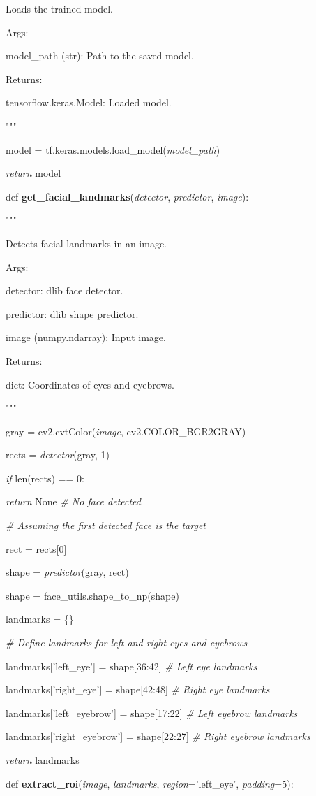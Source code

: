 \documentclass[
]{article}
\begin{document}
Loads the trained model.

Args:

model\_path (str): Path to the saved model.

Returns:

tensorflow.keras.Model: Loaded model.

"""

model = tf.keras.models.load\_model(\emph{model\_path})

\emph{return} model

def \textbf{get\_facial\_landmarks}(\emph{detector}, \emph{predictor}, \emph{image}):

"""

Detects facial landmarks in an image.

Args:

detector: dlib face detector.

predictor: dlib shape predictor.

image (numpy.ndarray): Input image.

Returns:

dict: Coordinates of eyes and eyebrows.

"""

gray = cv2.cvtColor(\emph{image}, cv2.COLOR\_BGR2GRAY)

rects = \emph{detector}(gray, 1)

\emph{if} len(rects) == 0:

\emph{return} None \emph{\# No face detected}

\emph{\# Assuming the first detected face is the target}

rect = rects{[}0{]}

shape = \emph{predictor}(gray, rect)

shape = face\_utils.shape\_to\_np(shape)

landmarks = \{\}

\emph{\# Define landmarks for left and right eyes and eyebrows}

landmarks{[}'left\_eye'{]} = shape{[}36:42{]} \emph{\# Left eye landmarks}

landmarks{[}'right\_eye'{]} = shape{[}42:48{]} \emph{\# Right eye landmarks}

landmarks{[}'left\_eyebrow'{]} = shape{[}17:22{]} \emph{\# Left eyebrow landmarks}

landmarks{[}'right\_eyebrow'{]} = shape{[}22:27{]} \emph{\# Right eyebrow landmarks}

\emph{return} landmarks

def \textbf{extract\_roi}(\emph{image}, \emph{landmarks}, \emph{region}='left\_eye', \emph{padding}=5):
\end{document}
